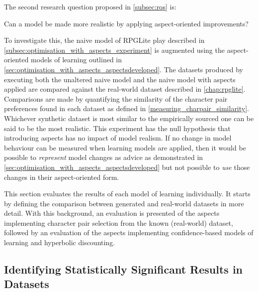 

The second research question proposed in \cref{subsec:rqs} is:

\begin{researchquestion}
  Can a model be made more realistic by applying aspect-oriented improvements?
\end{researchquestion}

To investigate this, the naive model of RPGLite play described in
\cref{subsec:optimisation_with_aspects_experiment} is augmented using the
aspect-oriented models of learning outlined in
\cref{sec:optimisation_with_aspects_aspectsdeveloped}. The datasets produced by
executing both the unaltered naive model and the naive model with aspects
applied are compared against the real-world dataset described in
\cref{chap:rpglite}. Comparisons are made by quantifying the similarity of
the character pair preferences found in each dataset as defined in
\cref{measuring_charpair_similarity}. Whichever synthetic dataset is most
similar to the empirically sourced one can be said to be the most realistic.
This experiment has the null hypothesis that introducing aspects has no impact
of model realism. If no change in model behaviour can be measured when learning
models are applied, then it would be possible to \emph{represent} model changes as
advice as demonstrated in \cref{sec:optimisation_with_aspects_aspectsdeveloped}
but not possible to \emph{use} those changes in their aspect-oriented form.

This section evaluates the results of each model of learning individually. It
starts by defining the comparison between generated and real-world datasets in
more detail. With this background, an evaluation is presented of the aspects
implementing character pair selection from the known (real-world) dataset,
followed by an evaluation of the aspects implementing confidence-based models of
learning and hyperbolic discounting.



\subsection{Identifying Statistically Significant Results in Datasets}



